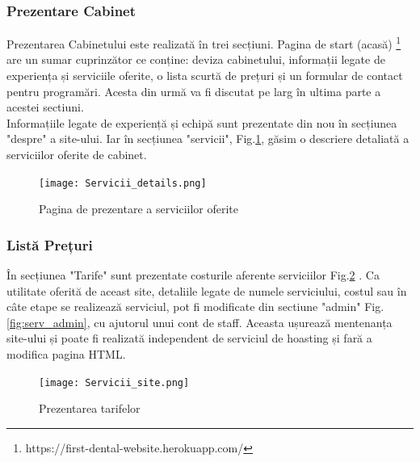 \documentclass[11pt]{scrartcl} %
\begin{document}

\subsubsection{Prezentare Cabinet}

Prezentarea Cabinetului este realizată în trei secțiuni. Pagina de start (acasă) \footnote{https://first-dental-website.herokuapp.com/} are un sumar cuprinzător ce conține: deviza cabinetului, informații legate de experiența și serviciile oferite, o lista scurtă de prețuri și un formular de contact pentru programări. Acesta din urmă va fi discutat pe larg în ultima parte a acestei sectiuni.\\
Informațiile legate de experiență și echipă sunt prezentate din nou în secțiunea "despre" a site-ului. Iar în secțiunea "servicii", Fig.\ref{fig:serv_details}, găsim o descriere detaliată a serviciilor oferite de cabinet. 

\begin{figure}[h] %
	\centering
	\texttt{[image: Servicii\_details.png]} %
	\caption{Pagina de prezentare a serviciilor oferite}
	\label{fig:serv_details}
\end{figure}



\subsubsection{Listă Prețuri}

În secțiunea "Tarife" sunt prezentate costurile aferente serviciilor Fig.\ref{fig:serv_site} . Ca utilitate oferită de aceast site, detaliile legate de numele serviciului, costul sau în câte etape se realizează serviciul, pot fi modificate din sectiune "admin" Fig.\ref{fig:serv_admin}, cu ajutorul unui cont de staff. Aceasta ușurează mentenanța site-ului și poate fi realizată independent de serviciul de hoasting și fară a modifica pagina HTML. 

\begin{figure}[h] %
	\centering
	\texttt{[image: Servicii\_site.png]} %
	\caption{Prezentarea tarifelor}
	\label{fig:serv_site}
\end{figure}
\end{document}
